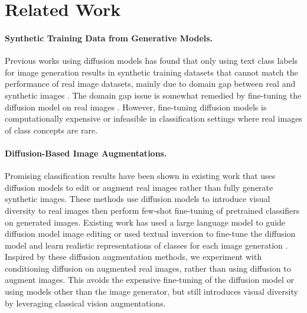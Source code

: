 \section{Related Work}
\vspace{-0.3cm}
\paragraph{Synthetic Training Data from Generative Models.}
Previous works using diffusion models has found that only using text class labels for image generation results in synthetic training datasets that cannot match the performance of real image datasets, mainly due to domain gap between real and synthetic images \citep{is_synthetic_data, fake_it}. 
The domain gap issue is somewhat remedied by fine-tuning the diffusion model on real images \citep{syntheticdataimagenet}. However, fine-tuning diffusion models is computationally expensive or infeasible in classification settings where real images of class concepts are rare.

\vspace{-0.3cm}
\paragraph{Diffusion-Based Image Augmentations.}
Promising classification results have been shown in existing work that uses diffusion models to edit or augment real images rather than fully generate synthetic images. 
These methods use diffusion models to introduce visual diversity to real images then perform few-shot fine-tuning of pretrained classifiers on generated images. 
Existing work has used a large language model to guide diffusion model image editing \cite{diversify} or used textual inversion \cite{text_inversion} to fine-tune the diffusion model and learn realistic representations of classes for each image generation \citep{da-fusion}. 
Inspired by these diffusion augmentation methods, we experiment with conditioning diffusion on augmented real images, rather than using diffusion to augment images. 
This avoids the expensive fine-tuning of the diffusion model or using models other than the image generator, but still introduces visual diversity by leveraging classical vision augmentations. 


